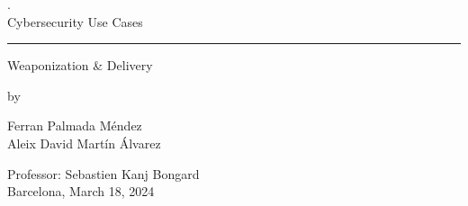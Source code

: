 \begin{center}

{
    {\color{white}.}\\
    \vspace{3cm}
    \sffamily 
    {\Huge Cybersecurity Use Cases}\\
    \vspace{0.5cm}

    {\color{black}\hrule height 1pt}
    \vspace{1cm}

    {\LARGE{Weaponization \& Delivery\\}
    \vspace{0.5cm}
    \large{
    by\\
    \vspace{0.5cm}
    
    Ferran Palmada Méndez\\\vspace{5pt}
    Aleix David Martín Álvarez}}
    \vspace{5.5cm}

    {Professor: Sebastien Kanj Bongard\\}
    {Barcelona, March 18, 2024}
}

\end{center}

\newpage